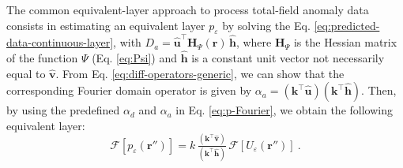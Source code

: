 The common equivalent-layer approach to process total-field anomaly data consists in 
estimating an equivalent layer $p_{\varepsilon}$ by solving the Eq. 
\ref{eq:predicted-data-continuous-layer},
with $D_{a} = \hat{\mathbf{u}}^{\top} \mathbf{H}_{\Psi}(\mathbf{r}) \, \hat{\mathbf{h}}$, 
where $\mathbf{H}_{\Psi}$ is the Hessian matrix \citep[e.g.,][p. 158]{kaplan2002} of the 
function $\Psi$ (Eq. \ref{eq:Psi}) and $\hat{\mathbf{h}}$ is a constant unit vector not 
necessarily equal to $\hat{\mathbf{v}}$. From Eq. \ref{eq:diff-operators-generic}, we can 
show that the corresponding Fourier domain operator is given by 
$\alpha_{a} = \left(\mathbf{k}^{\top} \hat{\mathbf{u}} \right)\left(\mathbf{k}^{\top} \hat{\mathbf{h}} \right)$.
Then, by using the predefined $\alpha_{d}$ and $\alpha_{a}$ in Eq. \ref{eq:p-Fourier}, we 
obtain the following equivalent layer:
\begin{equation}
	\mathcal{F} [ p_{\varepsilon}(\mathbf{r}'') ] =
	k \, \tfrac{
		\left(\mathbf{k}^{\top} \hat{\mathbf{v}} \right)
		}{
		\left(\mathbf{k}^{\top} \hat{\mathbf{h}} \right)
		} \,
	\mathcal{F} \left[ U_{\varepsilon}(\mathbf{r}'') \right] \: .
	\label{eq:p-Fourier-dipoles}
\end{equation}


